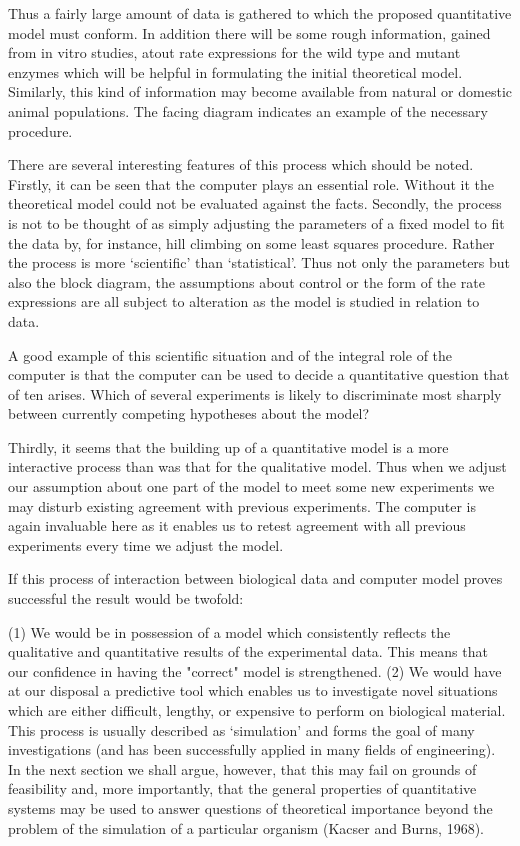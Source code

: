 Thus a fairly large amount of data is gathered to which the proposed quantitative model must conform. In addition there will be some rough information, gained from in vitro studies, atout rate expressions for the wild type and mutant enzymes which will be helpful in formulating the initial theoretical model. Similarly, this kind of information may become available from natural or domestic animal populations. The facing diagram indicates an example of the necessary procedure.

There are several interesting features of this process which should be noted. Firstly, it can be seen that the computer plays an essential role. Without it the theoretical model could not be evaluated against the facts. Secondly, the process is not to be thought of as simply adjusting the parameters of a fixed model to fit the data by, for instance, hill climbing on some least squares procedure. Rather the process is more `scientific' than `statistical'. Thus not only the parameters but also the block diagram, the assumptions about control or the form of the rate expressions are all subject to alteration as the model is studied in relation to data.

A good example of this scientific situation and of the integral role of the computer is that the computer can be used to decide a quantitative question that of ten arises. Which of several experiments is likely to discriminate most sharply between currently competing hypotheses about the model?

Thirdly, it seems that the building up of a quantitative model is a more interactive process than was that for the qualitative model. Thus when we adjust our assumption about one part of the model to meet some new experiments we may disturb existing agreement with previous experiments. The computer is again invaluable here as it enables us to retest agreement with all previous experiments every time we adjust the model.

If this process of interaction between biological data and computer model proves successful the result would be twofold:

(1) We would be in possession of a model which consistently reflects the qualitative and quantitative results of the experimental data. This means that our confidence in having the "correct" model is strengthened. (2) We would have at our disposal a predictive tool which enables us to investigate novel situations which are either difficult, lengthy, or expensive to perform on biological material. This process is usually described as `simulation' and forms the goal of many investigations (and has been successfully applied in many fields of engineering). In the next section we shall argue, however, that this may fail on grounds of feasibility and, more importantly, that the general properties of quantitative systems may be used to answer questions of theoretical importance beyond the problem of the simulation of a particular organism (Kacser and Burns, 1968).


